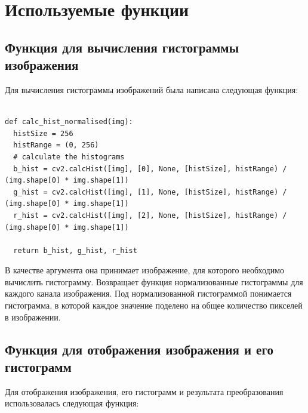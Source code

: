 \section{Используемые функции}

\subsection{Функция для вычисления гистограммы изображения}

Для вычисления гистограммы изображений была написана следующая функция:

\begin{lstlisting}

def calc_hist_normalised(img):
  histSize = 256
  histRange = (0, 256)
  # calculate the histograms
  b_hist = cv2.calcHist([img], [0], None, [histSize], histRange) / (img.shape[0] * img.shape[1])
  g_hist = cv2.calcHist([img], [1], None, [histSize], histRange) / (img.shape[0] * img.shape[1])
  r_hist = cv2.calcHist([img], [2], None, [histSize], histRange) / (img.shape[0] * img.shape[1])

  return b_hist, g_hist, r_hist
\end{lstlisting}

В качестве аргумента она принимает изображение, для которого необходимо вычислить гистограмму. Возвращает функция нормализованные гистограммы для каждого канала изображения.
Под нормализованной гистограммой понимается гистограмма, в которой каждое значение поделено на общее количество пикселей в изображении.

\subsection{Функция для отображения изображения и его гистограмм}
Для отображения изображения, его гистограмм и результата преобразования использовалась следующая функция: 

